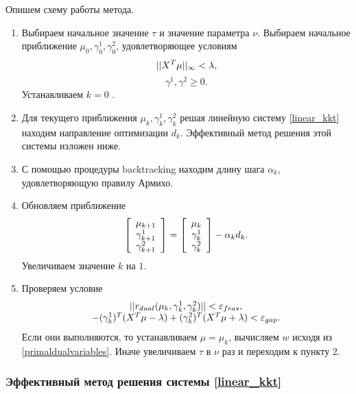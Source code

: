 \documentclass[12pt]{article}
\begin{document}
		Опишем схему работы метода.
		\begin{enumerate}
			\item Выбираем начальное значение $\tau$ и значение параметра $\nu$. Выбираем начальное приближение $\mu_0, \gamma^1_0, \gamma^2_0$, удовлетворяющее условиям 
			$$ ||X^T \mu||_\infty < \lambda,$$
			$$\gamma^1, \gamma^2 \ge 0.$$
			Устанавливаем $k = 0$ .
			
			\item Для текущего приближения $\mu_k, \gamma^1_k, \gamma^2_k$ решая линейную систему \ref{linear_kkt} находим направление оптимизации $d_k$. Эффективный метод решения этой системы изложен ниже. 
			
			\item С помощью процедуры backtracking находим длину шага $\alpha_k$, удовлетворяющую правилу Армихо.
			
			\item Обновляем приближение
			$$
			\left [
			\begin{array}[l]{c}
				\mu_{k+1} \\
				\gamma^1_{k+1}\\
				\gamma^2_{k+1}
			\end{array}
			\right ] 
			= 
			\left [
			\begin{array}[l]{c}
				\mu_{k} \\
				\gamma^1_{k}\\
				\gamma^2_{k}
			\end{array}
			\right ] 
			 - \alpha_k d_k.$$
			Увеличиваем значение $k$ на $1$.
			
			\item Проверяем условие
			$$
			\begin{array}[c]{c}
				||r_{dual}(\mu_k, \gamma^1_k, \gamma^2_k)|| < \varepsilon_{feas},\\
				-(\gamma^1_k)^T (X^T \mu - \lambda) + (\gamma^2_k)^T (X^T \mu + \lambda) < \varepsilon_{gap}.
			\end{array}
			$$
			Если они выполняются, то устанавливаем $\mu = \mu_k$, вычисляем $w$ исходя из \ref{primaldualvariables}. Иначе увеличиваем $\tau$ в $\nu$ раз и переходим к пункту 2.
		\end{enumerate}
		
		 \subsubsection{Эффективный метод решения системы \ref{linear_kkt}}
			
\end{document}

